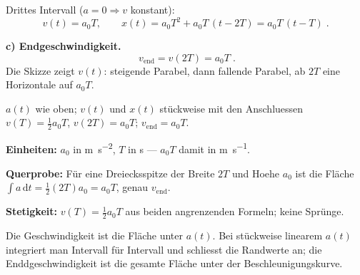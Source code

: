 Drittes Intervall ($a=0\Rightarrow v$ konstant):
\begin{equation}
  v(t)=a_0T,\qquad
  x(t)=a_0T^2+a_0T\,(t-2T)=a_0T\,(t-T)\;.
\end{equation}

\textbf{c) Endgeschwindigkeit.}
\begin{equation}
  \boxed{\;v_{\mathrm{end}}=v(2T)=a_0T\;}.
\end{equation}
Die Skizze zeigt $v(t)$: steigende Parabel, dann fallende Parabel, ab $2T$
eine Horizontale auf $a_0T$.

\begin{ergebnis}
$a(t)$ wie oben; $v(t)$ und $x(t)$ stückweise mit den Anschluessen
$v(T)=\tfrac12a_0T$, $v(2T)=a_0T$; $v_{\mathrm{end}}=a_0T$.
\end{ergebnis}

\begin{kontrolle}
\textbf{Einheiten:} $a_0$ in \unit{\metre\per\second\squared}, $T$ in
\unit{\second} --- $a_0T$ damit in \unit{\metre\per\second}. \checkmark

\textbf{Querprobe:} Für eine Dreiecksspitze der Breite $2T$ und Hoehe
$a_0$ ist die Fläche $\int a\,\mathrm dt=\frac12(2T)a_0=a_0T$, genau
$v_{\mathrm{end}}$. \checkmark

\textbf{Stetigkeit:} $v(T)=\tfrac12a_0T$ aus beiden angrenzenden
Formeln; keine Sprünge. \checkmark
\end{kontrolle}

\begin{merksatz}
Die Geschwindigkeit ist die Fläche unter $a(t)$. Bei stückweise
linearem $a(t)$ integriert man Intervall für Intervall und schliesst die
Randwerte an; die Enddgeschwindigkeit ist die gesamte Fläche unter der
Beschleunigungskurve.
\end{merksatz}
